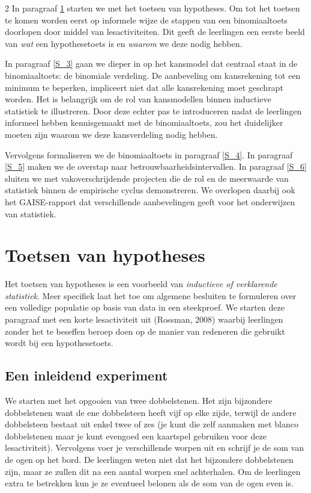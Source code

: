 \begin{multicols}{2}
In paragraaf \ref{S_2} starten we met het toetsen van hypotheses. Om tot het toetsen te komen worden eerst op informele wijze de stappen van een binomiaaltoets doorlopen door middel van lesactiviteiten. Dit geeft de leerlingen een eerste beeld van \emph{wat} een hypothesetoets is en \emph{waarom} we deze nodig hebben. 

In paragraaf \ref{S_3} gaan we dieper in op het kansmodel dat centraal staat in de binomiaaltoets: de binomiale verdeling. De aanbeveling om kansrekening tot een minimum te beperken, impliceert niet dat alle kansrekening moet geschrapt worden. Het is belangrijk om de rol van kansmodellen binnen inductieve statistiek te illustreren. Door deze echter pas te introduceren nadat de leerlingen informeel hebben kennisgemaakt met de binomiaaltoets, zou het duidelijker moeten zijn waarom we deze kansverdeling nodig hebben. 

Vervolgens formaliseren we de binomiaaltoets in paragraaf \ref{S_4}. In paragraaf \ref{S_5} maken we de overstap naar betrouwbaarheidsintervallen. In paragraaf \ref{S_6} sluiten we met vakoverschrijdende projecten die de rol en de meerwaarde van statistiek binnen de empirische cyclus demonstreren. We overlopen daarbij ook het GAISE-rapport dat verschillende aanbevelingen geeft voor het onderwijzen van statistiek.

\section{Toetsen van hypotheses} \label{S_2}

Het toetsen van hypotheses is een voorbeeld van \emph{inductieve of verklarende statistiek}. Meer specifiek laat het toe om algemene besluiten te formuleren over een volledige populatie op basis van data in een steekproef. We starten deze paragraaf met een korte lesactiviteit uit (Rossman, 2008) waarbij leerlingen zonder het te beseffen beroep doen op de manier van redeneren die gebruikt wordt bij een hypothesetoets. 

\subsection*{Een inleidend experiment}
    
We starten met het opgooien van twee dobbelstenen. Het zijn bijzondere dobbelstenen want de ene dobbelsteen heeft vijf op elke zijde, terwijl de andere dobbelsteen bestaat uit enkel twee of zes (je kunt die zelf aanmaken met blanco dobbelstenen maar je kunt evengoed een kaartspel gebruiken voor deze lesactiviteit). Vervolgens voer je verschillende worpen uit en schrijf je de som van de ogen op het bord. De leerlingen weten niet dat het bijzondere dobbelstenen zijn, maar ze zullen dit na een aantal worpen snel achterhalen. Om de leerlingen extra te betrekken kun je ze eventueel belonen als de som van de ogen even is. 
    

\end{multicols}
